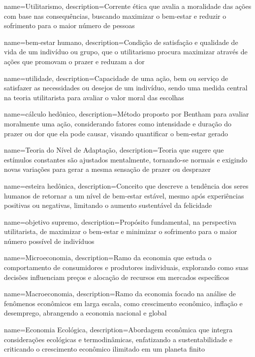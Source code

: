 {
	name=Utilitarismo,
	description={Corrente ética que avalia a moralidade das ações com base nas consequências, buscando maximizar o bem-estar e reduzir o sofrimento para o maior número de pessoas}
}

{
	name=bem-estar humano,
	description={Condição de satisfação e qualidade de vida de um indivíduo ou grupo, que o utilitarismo procura maximizar através de ações que promovam o prazer e reduzam a dor}
}

{
	name=utilidade,
	description={Capacidade de uma ação, bem ou serviço de satisfazer as necessidades ou desejos de um indivíduo, sendo uma medida central na teoria utilitarista para avaliar o valor moral das escolhas}
}

{
	name=cálculo hedônico,
	description={Método proposto por Bentham para avaliar moralmente uma ação, considerando fatores como intensidade e duração do prazer ou dor que ela pode causar, visando quantificar o bem-estar gerado}
}

{
	name=Teoria do Nível de Adaptação,
	description={Teoria que sugere que estímulos constantes são ajustados mentalmente, tornando-se normais e exigindo novas variações para gerar a mesma sensação de prazer ou desprazer}
}

{
	name=esteira hedônica,
	description={Conceito que descreve a tendência dos seres humanos de retornar a um nível de bem-estar estável, mesmo após experiências positivas ou negativas, limitando o aumento sustentável da felicidade}
}

{
	name=objetivo supremo,
	description={Propósito fundamental, na perspectiva utilitarista, de maximizar o bem-estar e minimizar o sofrimento para o maior número possível de indivíduos}
}

{
	name=Microeconomia,
	description={Ramo da economia que estuda o comportamento de consumidores e produtores individuais, explorando como suas decisões influenciam preços e alocação de recursos em mercados específicos}
}

{
	name=Macroeconomia,
	description={Ramo da economia focado na análise de fenômenos econômicos em larga escala, como crescimento econômico, inflação e desemprego, abrangendo a economia nacional e global}
}

{
	name=Economia Ecológica,
	description={Abordagem econômica que integra considerações ecológicas e termodinâmicas, enfatizando a sustentabilidade e criticando o crescimento econômico ilimitado em um planeta finito}
}


